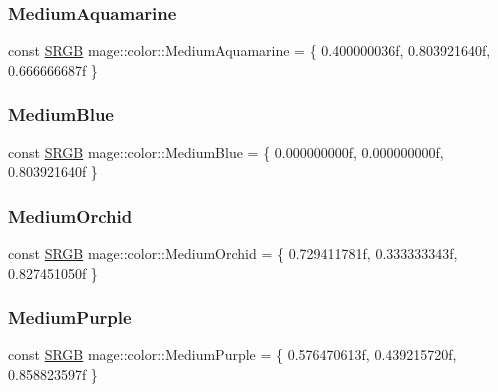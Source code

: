 \subsubsection{\texorpdfstring{Medium\+Aquamarine}{MediumAquamarine}}
{\footnotesize\ttfamily const \hyperlink{structmage_1_1_s_r_g_b}{S\+R\+GB} mage\+::color\+::\+Medium\+Aquamarine = \{ 0.\+400000036f, 0.\+803921640f, 0.\+666666687f \}}

\hypertarget{namespacemage_1_1color_a25277573a2c7954ecdf46e37aac44a02}{}\label{namespacemage_1_1color_a25277573a2c7954ecdf46e37aac44a02} 
\subsubsection{\texorpdfstring{Medium\+Blue}{MediumBlue}}
{\footnotesize\ttfamily const \hyperlink{structmage_1_1_s_r_g_b}{S\+R\+GB} mage\+::color\+::\+Medium\+Blue = \{ 0.\+000000000f, 0.\+000000000f, 0.\+803921640f \}}

\hypertarget{namespacemage_1_1color_a32f2d8a82097bf8d45397457656d1a9a}{}\label{namespacemage_1_1color_a32f2d8a82097bf8d45397457656d1a9a} 
\subsubsection{\texorpdfstring{Medium\+Orchid}{MediumOrchid}}
{\footnotesize\ttfamily const \hyperlink{structmage_1_1_s_r_g_b}{S\+R\+GB} mage\+::color\+::\+Medium\+Orchid = \{ 0.\+729411781f, 0.\+333333343f, 0.\+827451050f \}}

\hypertarget{namespacemage_1_1color_a3733d64e3f1c7906847548ecefd66c8c}{}\label{namespacemage_1_1color_a3733d64e3f1c7906847548ecefd66c8c} 
\subsubsection{\texorpdfstring{Medium\+Purple}{MediumPurple}}
{\footnotesize\ttfamily const \hyperlink{structmage_1_1_s_r_g_b}{S\+R\+GB} mage\+::color\+::\+Medium\+Purple = \{ 0.\+576470613f, 0.\+439215720f, 0.\+858823597f \}}

\hypertarget{namespacemage_1_1color_a819a1f60db591d9c96739cae2368c094}{}\label{namespacemage_1_1color_a819a1f60db591d9c96739cae2368c094} 
